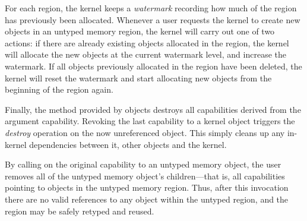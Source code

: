 For each  region, the kernel keeps
a \emph{watermark} recording how much of the region has previously been
allocated. Whenever a user requests the kernel to create new objects in
an untyped memory region, the kernel will carry out one of two actions:
if there are already existing objects allocated in the region, the
kernel will allocate the new objects at the current watermark level, and
increase the watermark. If all objects previously allocated in the
region have been deleted, the kernel will reset the watermark and start
allocating new objects from the beginning of the region again.

Finally, the  method provided by  objects
destroys all capabilities derived from the argument capability. Revoking
the last capability to a kernel object triggers the \emph{destroy}
operation on the now unreferenced object. This simply cleans up any in-kernel dependencies between
it, other objects and the kernel.

By calling  on the original capability to an untyped memory
object, the user removes all of the untyped memory object's
children---that is, all capabilities pointing to objects in the untyped
memory region.  Thus, after this invocation there are no valid references
to any object within the untyped region, and the region may be safely
retyped and reused.

